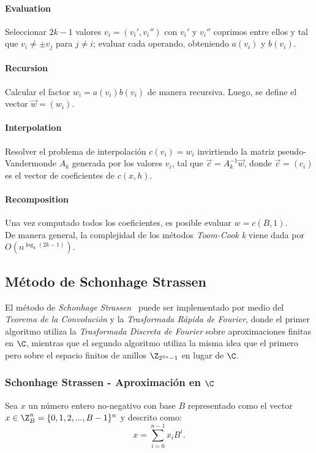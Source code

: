 \paragraph{Evaluation}
Seleccionar $2k-1$ valores $v_{i}=(v_{i}',v_{i}'')$ con $v_{i}'$ y $v_{i}''$ coprimos entre ellos y tal que $v_{i} \neq \pm v_{j}$ para $j \neq i$; evaluar cada operando, obteniendo $a(v_{i})$ y $b(v_{i})$.

\paragraph{Recursion}
Calcular el factor $w_{i}=a(v_{i})b(v_{i})$ de manera recursiva. Luego, se define el vector $\vec{w}=(w_{i})$.

\paragraph{Interpolation}
Resolver el problema de interpolación $c(v_{i})=w_{i}$ invirtiendo la matriz pseudo-Vandermonde $A_{k}$ generada por los valores $v_{i}$, tal que $\vec{c}=A^{-1}_{k}\vec{w}$, donde $\vec{c}=(c_{i})$ es el vector de coeficientes de $c(x,h)$.

\paragraph{Recomposition}
Una vez computado todos los coeficientes, es posible evaluar $w=c(B,1)$.\\

De manera general, la complejidad de los métodos \textit{Toom-Cook k} viene dada por $O(n^{\log_{k}{(2k-1)}})$.

\subsection{Método de Schonhage Strassen}
El método de \textit{Schonhage Strassen}~\cite{SchonhageS71} puede ser implementado por medio del  \textit{Teorema de la Convolución} y la \textit{Trasformada Rápida de Fourier}, donde el primer algoritmo utiliza la \textit{Trasformada Discreta de Fourier} sobre aproximaciones finitas en $\C$, mientras que el segundo algoritmo utiliza la misma idea que el primero pero sobre el espacio finitos de anillos $\Z_{2^{2n}-1}$ en lugar de $\C$.

\subsubsection{Schonhage Strassen - Aproximación en $\C$}
Sea $x$ un número entero no-negativo con base $B$ representado como el vector $x\in\Z^{n}_{B}=\{0,1,2,...,B-1\}^{n}$ y descrito como:
\begin{equation}
    x=\sum^{n-1}_{i=0}{x_{i}B^{i}}.
\end{equation}

